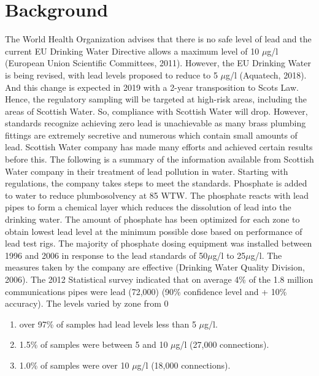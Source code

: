 \documentclass[11pt,twoside]{article}
\numberwithin{Theorem}{section}
\numberwithin{Definition}{section}
\numberwithin{Lemma}{section}
\numberwithin{Algorithm}{section}
\numberwithin{equation}{section}
\begin{document}
\section{Background}
\label{sec:background}
The World Health Organization advises that there is no safe level of lead and the current EU Drinking Water Directive allows a maximum level of 10 $\mu$g/l (European Union Scientific Committees, 2011). However, the EU Drinking Water is being revised, with lead levels proposed to reduce to 5 $\mu$g/l (Aquatech, 2018). And this change is expected in 2019 with a 2-year transposition to Scots Law. Hence, the regulatory sampling will be targeted at high-risk areas, including the areas of Scottish Water. So, compliance with Scottish Water will drop. However, standards recognize achieving zero lead is unachievable as many brass plumbing fittings are extremely secretive and numerous which contain small amounts of lead.
Scottish Water company has made many efforts and achieved certain results before this. The following is a summary of the information available from Scottish Water company in their treatment of lead pollution in water.
Starting with regulations, the company takes steps to meet the standards. Phosphate is added to water to reduce plumbosolvency at 85 WTW. The phosphate reacts with lead pipes to form a chemical layer which reduces the dissolution of lead into the drinking water. The amount of phosphate has been optimized for each zone to obtain lowest lead level at the minimum possible dose based on performance of lead test rigs. The majority of phosphate dosing equipment was installed between 1996 and 2006 in response to the lead standards of 50$\mu$g/l to 25$\mu$g/l. The measures taken by the company are effective (Drinking Water Quality Division, 2006). The 2012 Statistical survey indicated that on average 4\% of the 1.8 million communications pipes were lead (72,000) (90\% confidence level and + 10\% accuracy). The levels varied by zone from 0%

\begin{enumerate}
\item over 97\% of samples had lead levels less than 5 $\mu$g/l.
\item 1.5\% of samples were between 5 and 10 $\mu$g/l (27,000 connections).
\item 1.0\% of samples were over 10 $\mu$g/l (18,000 connections).
\end{enumerate}
\end{document}

